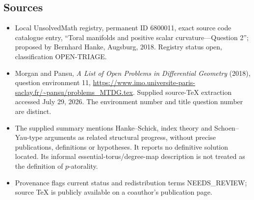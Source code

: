 \documentclass[11pt]{article}
\begin{document}
\subsection{Sources}
\begin{itemize}
\item Local UnsolvedMath registry, permanent ID 6800011, exact source code catalogue entry, ``Toral manifolds and positive scalar curvature---Question 2''; proposed by Bernhard Hanke, Augsburg, 2018. Registry status open, classification OPEN-TRIAGE.
\item Morgan and Pansu, \emph{A List of Open Problems in Differential Geometry} (2018), question environment 11, \url{https://www.imo.universite-paris-saclay.fr/~pansu/problems_MTDG.tex}. Supplied source-TeX extraction accessed July 29, 2026. The environment number and title question number are distinct.
\item The supplied summary mentions Hanke--Schick, index theory and Schoen--Yau-type arguments as related structural progress, without precise publications, definitions or hypotheses. It reports no definitive solution located. Its informal essential-torus/degree-map description is not treated as the definition of $p$-atorality.
\item Provenance flags current status and redistribution terms NEEDS\_REVIEW; source TeX is publicly available on a coauthor's publication page.
\end{itemize}
\end{document}
